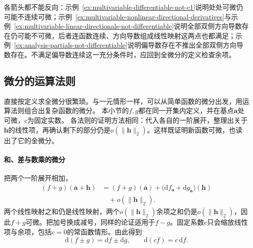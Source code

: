 各箭头都不能反向：示例~\ref{ex:multivariable-differentiable-not-c1}说明处处可微仍可能不连续可微；示例~\ref{ex:multivariable-nonlinear-directional-derivatives}与示例~\ref{ex:multivariable-linear-directionals-not-differentiable}说明全部双侧方向导数存在仍可能不可微，后者连函数连续、方向导数组成线性映射这两点也都满足；示例~\ref{ex:analysis-partials-not-differentiable}说明偏导数存在不推出全部双侧方向导数存在。不满足偏导数连续这一充分条件时，应回到全微分的定义检查余项。

\subsection{微分的运算法则}
\label{sec:multivariable-differential-rules}

直接按定义求全微分很繁琐。与一元情形一样，可以从简单函数的微分出发，用运算法则组合出复杂函数的微分。
本小节的$f,g$都在同一开集内定义，并在基点$\bm a$处可微，$c$为固定实数。
各法则的证明方法相同：代入各自的一阶展开，整理出关于$\bm h$的线性项，再确认剩下的部分仍是$o(\lVert\bm h\rVert_2)$。这样既证明新函数可微，也读出了它的全微分。

\paragraph{和、差与数乘的微分}
把两个一阶展开相加，
\[
 \begin{aligned}
 (f+g)(\bm a+\bm h)
 &=(f+g)(\bm a)+\bigl(\mathrm df_{\bm a}+\mathrm dg_{\bm a}\bigr)(\bm h)\\
 &\quad+o(\lVert\bm h\rVert_2).
 \end{aligned}
\]
两个线性映射之和仍是线性映射，两个$o(\lVert\bm h\rVert_2)$余项之和仍是$o(\lVert\bm h\rVert_2)$，因此$f+g$可微。把加号换成减号，同样的论证适用于$f-g$。固定系数$c$只会缩放线性项与余项，包括$c=0$的常函数情形。由此得到
\begin{equation}
 \mathrm d(f\pm g)=\mathrm df\pm\mathrm dg,\qquad \mathrm d(cf)=c\,\mathrm df.
\label{eq:multivariable-linear-rule-differential}
\end{equation}

